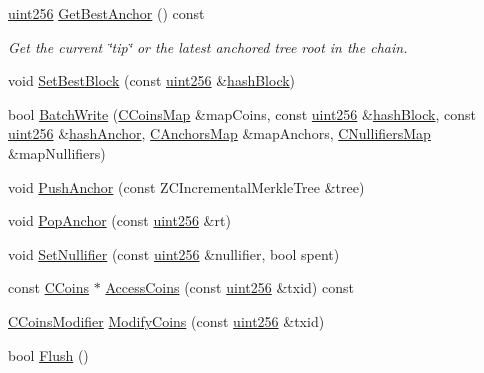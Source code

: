 \begin{DoxyCompactItemize}
\mbox{\hyperlink{classuint256}{uint256}} \mbox{\hyperlink{class_c_coins_view_cache_a8f1e864bff1617bae243bd0c7b29d2ed}{Get\+Best\+Anchor}} () const
\begin{DoxyCompactList}\small\item\em Get the current \char`\"{}tip\char`\"{} or the latest anchored tree root in the chain. \end{DoxyCompactList}\item 
void \mbox{\hyperlink{class_c_coins_view_cache_aa3f787f77b123f0fd340fbe4e458b4ad}{Set\+Best\+Block}} (const \mbox{\hyperlink{classuint256}{uint256}} \&\mbox{\hyperlink{class_c_coins_view_cache_a229dddddbc5501edc250209a2ce5df8b}{hash\+Block}})
\item 
bool \mbox{\hyperlink{class_c_coins_view_cache_a3d661381b7eb233a8a13ea11ec5dac51}{Batch\+Write}} (\mbox{\hyperlink{coins_8h_a2886ba2fd0428bae777e1cbcabc02834}{C\+Coins\+Map}} \&map\+Coins, const \mbox{\hyperlink{classuint256}{uint256}} \&\mbox{\hyperlink{class_c_coins_view_cache_a229dddddbc5501edc250209a2ce5df8b}{hash\+Block}}, const \mbox{\hyperlink{classuint256}{uint256}} \&\mbox{\hyperlink{class_c_coins_view_cache_a72a4c55f52127b5e1b3e3a744a2b1cc3}{hash\+Anchor}}, \mbox{\hyperlink{coins_8h_a070827cc9d21a91b8f4f4f52a6f7c848}{C\+Anchors\+Map}} \&map\+Anchors, \mbox{\hyperlink{coins_8h_ab651cc287e9594190ef77d2fca2b14c7}{C\+Nullifiers\+Map}} \&map\+Nullifiers)
\item 
void \mbox{\hyperlink{class_c_coins_view_cache_a1e11b4aeaefd1a6ed6a98c8786465e95}{Push\+Anchor}} (const Z\+C\+Incremental\+Merkle\+Tree \&tree)
\item 
void \mbox{\hyperlink{class_c_coins_view_cache_a7e0b29874a39b165648fd3862035ca33}{Pop\+Anchor}} (const \mbox{\hyperlink{classuint256}{uint256}} \&rt)
\item 
void \mbox{\hyperlink{class_c_coins_view_cache_a820d28a0bb6c5cf4e6e41e2655d0e1fa}{Set\+Nullifier}} (const \mbox{\hyperlink{classuint256}{uint256}} \&nullifier, bool spent)
\item 
const \mbox{\hyperlink{class_c_coins}{C\+Coins}} $\ast$ \mbox{\hyperlink{class_c_coins_view_cache_a8e5341e8b01233949d6170dd4d1fd75d}{Access\+Coins}} (const \mbox{\hyperlink{classuint256}{uint256}} \&txid) const
\item 
\mbox{\hyperlink{class_c_coins_modifier}{C\+Coins\+Modifier}} \mbox{\hyperlink{class_c_coins_view_cache_ab67c0d489873ed735c4fc52aa66f0830}{Modify\+Coins}} (const \mbox{\hyperlink{classuint256}{uint256}} \&txid)
\item 
bool \mbox{\hyperlink{class_c_coins_view_cache_ac9888d4feaa46666d03871cd7cd1c01d}{Flush}} ()

\end{DoxyCompactItemize}
